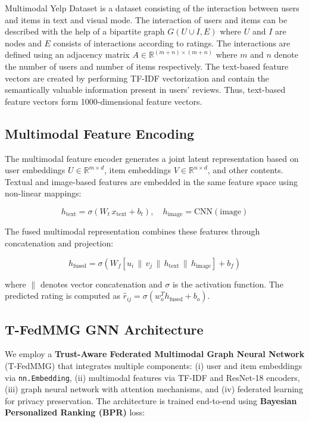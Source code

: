 \documentclass[journal]{IEEEtran} %
\begin{document}
Multimodal Yelp Dataset is a dataset consisting of the interaction between users and items in text and visual mode. The interaction of users and items can be described with
the help of a bipartite graph $G(U \cup I, E)$ where $U$ and $I$ are
nodes and $E$ consists of interactions according to ratings. The interactions are defined using
an adjacency matrix $A \in \mathbb{R}^{(m+n) \times (m+n)}$ where $m$ and $n$ denote the number of users and number of items respectively.
The text-based feature vectors are created by performing TF-IDF vectorization and contain the semantically valuable information present in users’ reviews. Thus, text-based feature vectors form 1000-dimensional feature vectors.

\subsection{Multimodal Feature Encoding}

The multimodal feature encoder generates a joint latent representation based on user embeddings $U \in \mathbb{R}^{m \times d}$, item embeddings $V \in \mathbb{R}^{n \times d}$, and other contents. Textual and image-based features are embedded in the same feature space using non-linear mappings:

\begin{equation}
h_{\text{text}} = \sigma(W_t \, x_{\text{text}} + b_t), \quad h_{\text{image}} = \text{CNN}(\text{image})
\end{equation}

The fused multimodal representation combines these features through concatenation and projection:

\begin{equation}
h_{\text{fused}} = \sigma\left(W_f \left[u_i \,\|\, v_j \,\|\, h_{\text{text}} \,\|\, h_{\text{image}}\right] + b_f\right)
\end{equation}

where $\|$ denotes vector concatenation and $\sigma$ is the activation function. The predicted rating is computed as $\hat{r}_{ij} = \sigma(w_o^T h_{\text{fused}} + b_o)$.

\subsection{T-FedMMG GNN Architecture}

We employ a \textbf{Trust-Aware Federated Multimodal Graph Neural Network} (T-FedMMG) that integrates multiple components: (i) user and item embeddings via \texttt{nn.Embedding}, (ii) multimodal features via TF-IDF and ResNet-18 encoders, (iii) graph neural network with attention mechanisms, and (iv) federated learning for privacy preservation. The architecture is trained end-to-end using \textbf{Bayesian Personalized Ranking (BPR)} loss:
\end{document}
